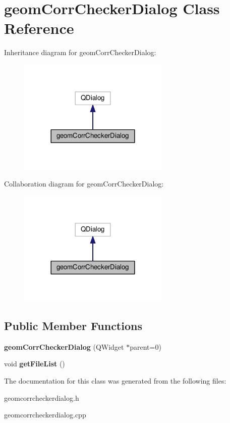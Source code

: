 \hypertarget{classgeomCorrCheckerDialog}{}\section{geom\+Corr\+Checker\+Dialog Class Reference}
\label{classgeomCorrCheckerDialog}


Inheritance diagram for geom\+Corr\+Checker\+Dialog\+:
\nopagebreak
\begin{figure}[H]
\begin{center}
\leavevmode
\includegraphics[width=204pt]{classgeomCorrCheckerDialog__inherit__graph}
\end{center}
\end{figure}


Collaboration diagram for geom\+Corr\+Checker\+Dialog\+:
\nopagebreak
\begin{figure}[H]
\begin{center}
\leavevmode
\includegraphics[width=204pt]{classgeomCorrCheckerDialog__coll__graph}
\end{center}
\end{figure}
\subsection*{Public Member Functions}
\begin{DoxyCompactItemize}
\item 
{\bfseries geom\+Corr\+Checker\+Dialog} (Q\+Widget $\ast$parent=0)\hypertarget{classgeomCorrCheckerDialog_ad9bfbbf7c84e264510a724a103fbe103}{}\label{classgeomCorrCheckerDialog_ad9bfbbf7c84e264510a724a103fbe103}

\item 
void {\bfseries get\+File\+List} ()\hypertarget{classgeomCorrCheckerDialog_aea1e154e1cd5180101fb01d1527969e4}{}\label{classgeomCorrCheckerDialog_aea1e154e1cd5180101fb01d1527969e4}

\end{DoxyCompactItemize}


The documentation for this class was generated from the following files\+:\begin{DoxyCompactItemize}
\item 
geomcorrcheckerdialog.\+h\item 
geomcorrcheckerdialog.\+cpp\end{DoxyCompactItemize}

